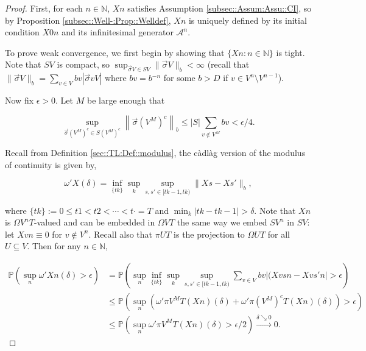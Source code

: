 \documentclass[12pt]{article}
\newcommand{\mb}{\mathbb}
\newcommand{\mc}{\mathcal}
\newcommand{\ra}{\rightarrow}
\newcommand{\os}{\overset}
\newcommand{\ep}{\epsilon}
\newcommand{\ind}{\hspace{24pt}}
\newcommand{\pr}{\mb{P}}							%
\renewcommand{\v}{v}							%
\renewcommand{\U}{U}							%
\renewcommand{\S}{S}							%
\newcommand{\s}{\sigma}							%
\newcommand{\sv}{\vec{\s}}						%
\renewcommand{\b}{b}							%
\newcommand{\T}{T}								%
\renewcommand{\t}{t}							%
\newcommand{\proj}{\pi}							%
\renewcommand{\tt}{s}							%
\newcommand{\ttt}{s'}							%
\newcommand{\X}{X}								%
\newcommand{\IG}{\mc{A}}						%
\newcommand{\degr}{D}							%
\newcommand{\sln}[1]{^{#1}}						%
\newcommand{\cconst}{M}							%
\newcommand{\cmodu}{\omega'}					%
\renewcommand{\it}{k}							%
\begin{document}
\begin{proof}
First, for each \(n\in\mb{N}\), \(\X{}{}{n}\) satisfies Assumption \ref{subsec::Assum:Assu::CI}, so by Proposition \ref{subsec::Well-:Prop::Welldef}, \(\X{}{}{n}\) is uniquely defined by its initial condition \(\X{}{0}{n}\) and its infinitesimal generator \(\IG\sln{n}\).

\ind To prove weak convergence, we first begin by showing that \(\{\X{}{}{n}:n\in \mb{N}\}\) is tight. Note that \(\S{V}\) is compact, so \(\sup_{\sv{}{V} \in \S{V}} \|\sv{}{V}\|_{\b{}} < \infty\) (recall that \(\|\sv{}{V}\|_{\b{}} = \sum_{\v \in V} \b{\v} |\sv{\v}{V}|\) where \(\b{\v} = \b{}^{-n}\) for some \(\b{} > \degr\) if \(\v \in V\sln{n}\setminus V\sln{n-1}\)).

\ind Now fix \(\ep > 0\). Let \(\cconst\) be large enough that

\[\sup_{\sv{}{\left(V\sln{\cconst}\right)^c} \in \S{\left(V\sln{\cconst}\right)^c}} \left\|\sv{}{\left(V\sln{\cconst}\right)^c}\right\|_{\b{}} \leq |\S|\sum_{\v \notin V\sln{\cconst}} \b{\v} < \ep/4.\]

Recall from Definition \ref{sec::TL:Def::modulus}, the c\`adl\`ag version of the modulus of continuity is given by,

\[\cmodu{\X{}{}}(\delta) = \inf_{\{\t{\it}\}} \sup_\it \sup_{\tt,\ttt \in [\t{\it-1},\t{\it})} \|\X{}{\tt} - \X{}{\ttt}\|_{\b{}},\]

where \(\{\t{\it}\} := 0 \leq \t{1} < \t{2} < \cdots < \t{\cdot} = \T\) and \(\min_\it|\t{\it} - \t{\it-1}| > \delta\). Note that \(\X{}{}{n}\) is \(\Omega{V\sln{n}}{\T}\)-valued and can be embedded in \(\Omega{V}{\T}\) the same way we embed \(\S{V\sln{n}}\) in \(\S{V}\): let \(\X{\v}{}{n} \equiv 0\) for \(\v \notin V\sln{n}\). Recall also that \(\proj{\U}{\T}\) is the projection to \(\Omega{\U}{\T}\) for all \(\U\subseteq V\). Then for any \(n\in \mb{N}\),

\begin{align*}
\pr\left(\sup_n \cmodu{\X{}{}{n}}(\delta) > \epsilon\right) &= \pr\left(\sup_n\inf_{\{\t{\it}\}}\sup_\it\sup_{\tt,\ttt \in [\t{\it-1},\t{\it})} \sum_{\v \in V} \b{\v}|(\X{\v}{\tt}{n} - \X{\v}{\ttt}{n}| > \epsilon \right)\\
&\leq \pr\left(\sup_n \left(\cmodu{\proj{V\sln{\cconst}}{\T}(\X{}{}{n})}(\delta) + \cmodu{\proj{\left(V\sln{\cconst}\right)^c}{\T}(\X{}{}{n})}(\delta)\right) > \ep\right)\\
&\leq \pr\left(\sup_n \cmodu{\proj{V\sln{\cconst}}{\T}(\X{}{}{n})}(\delta) > \ep/2\right) \os{\delta\searrow 0}{\ra} 0.
\end{align*}


\end{proof}
\end{document}
